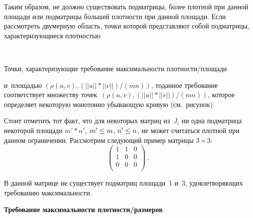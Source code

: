 \begin{multicols}{2}
\begin{description}
Таким образом,
не должно существовать подматрицы, более плотной при данной площади или 
подматрицы большей плот\-ности при данной площади. Если рассмотреть двумерную 
область, точки которой представляют собой подматрицы, характеризующиеся
плот\-ностью\linebreak\vspace*{-12pt}

 { \begin{center}  %
 \vspace*{-1pt}
 \mbox{%
 \epsfxsize=74mm %
 }


\end{center}


\noindent
{\small{Точки, характеризующие требование мак\-си\-маль\-ности 
плотности/площади}}
}


\vspace*{12pt}


\noindent
 и~площадью $(\rho(u,v), (||u||*||v||)/(mn))$, то\linebreak данное 
требование со\-от\-вет\-ст\-ву\-ет множеству\linebreak
 то\-чек~$(\rho(u,v), (||u||*||v||)/(mn))$, 
которое  определяет некоторую монотонно убывающую кривую (см.\ рисунок).





Стоит отметить тот факт, что для некоторых матриц из~$J_i$ ни одна подматрица 
некоторой площади $m'*n'$, $m'\hm \le m$, $n' \hm\le n$, не может считаться плотной при 
данном ограничении. Рассмотрим следующий пример матрицы $3\times 3$:
$$
\begin{pmatrix} 
1 & 1 & 0\\ 1 & 0 & 0 \\  0 & 0 & 0\\
\end{pmatrix}\,.
$$

В данной матрице не существует подматриц площади~1 и~3, удовлетворяющих 
требованию максимальности.

\item[\,] \textbf{Требование максимальности плотности/размеров}


\end{description}
\end{multicols}

